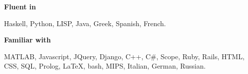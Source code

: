 \documentclass[margin,line]{resume}
\begin{document}
\begin{resume}
    \textbf{Fluent in}	\par\vspace{-4mm}
    {\addtolength{\leftskip}{2 mm} 
     Haskell, Python, LISP, Java, Greek, Spanish, French.
     }

    \textbf{Familiar with}\par\vspace{-4mm}
    {\addtolength{\leftskip}{2 mm} 
      MATLAB, Javascript, JQuery, Django, C++, C\#, Scope,  Ruby, Rails, HTML, CSS,  SQL, Prolog, \LaTeX, bash, MIPS, Italian, German, Russian.
    \par}


\end{resume}
\end{document}
